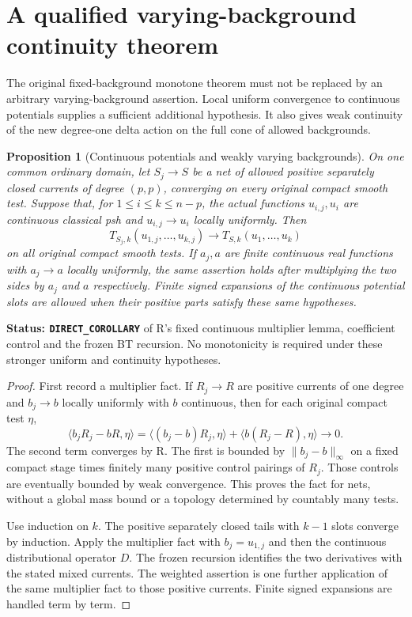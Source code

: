 \documentclass[11pt,a4paper]{article}
\numberwithin{equation}{section}
\newtheorem{proposition}[theorem]{Proposition}
\theoremstyle{definition}
\theoremstyle{remark}
\begin{document}
\section{A qualified varying-background continuity theorem}
\label{sec:r6-continuous-joint-stability}

The original fixed-background monotone theorem must not be replaced by
an arbitrary varying-background assertion. Local uniform convergence
to continuous potentials supplies a sufficient additional hypothesis.
It also gives weak continuity of the new degree-one delta action on
the full cone of allowed backgrounds.

\begin{proposition}[Continuous potentials and weakly varying backgrounds]
\label{prop:r6-continuous-joint-varying-background}
On one common ordinary domain, let $S_j\to S$ be a net of allowed
positive separately closed currents of degree $(p,p)$, converging on
every original compact smooth test. Suppose that, for
$1\le i\le k\le n-p$, the actual functions $u_{i,j},u_i$ are
continuous classical psh and $u_{i,j}\to u_i$ locally uniformly.
Then
\[
       T_{S_j,k}(u_{1,j},\ldots,u_{k,j})
                         \longrightarrow T_{S,k}(u_1,\ldots,u_k)
\]
on all original compact smooth tests. If $a_j,a$ are finite continuous
real functions with $a_j\to a$ locally uniformly, the same assertion
holds after multiplying the two sides by $a_j$ and $a$ respectively.
Finite signed expansions of the continuous potential slots are allowed
when their positive parts satisfy these same hypotheses.
\end{proposition}

\noindent\textbf{Status: \texttt{DIRECT\_COROLLARY}} of R's fixed
continuous multiplier lemma, coefficient control and the frozen BT
recursion. No monotonicity is required under these stronger uniform
and continuity hypotheses.

\begin{proof}
First record a multiplier fact. If $R_j\to R$ are positive currents
of one degree and $b_j\to b$ locally uniformly with $b$ continuous,
then for each original compact test $\eta$,
\[
 \langle b_jR_j-bR,\eta\rangle
    =\langle(b_j-b)R_j,\eta\rangle
                         +\langle b(R_j-R),\eta\rangle\longrightarrow0.
\]
The second term converges by R. The first is bounded by
$\|b_j-b\|_\infty$ on a fixed compact stage times finitely many
positive control pairings of $R_j$. Those controls are eventually
bounded by weak convergence. This proves the fact for nets, without
a global mass bound or a topology determined by countably many tests.

Use induction on $k$. The positive separately closed tails with
$k-1$ slots converge by induction. Apply the multiplier fact with
$b_j=u_{1,j}$ and then the continuous distributional operator $D$.
The frozen recursion identifies the two derivatives with the stated
mixed currents. The weighted assertion is one further application
of the same multiplier fact to those positive currents. Finite
signed expansions are handled term by term.
\end{proof}
\end{document}
